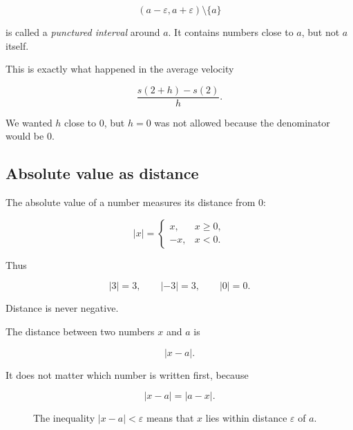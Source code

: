 \[
(a-\varepsilon,a+\varepsilon)\setminus\{a\}
\]

is called a \emph{punctured interval} around \(a\). It contains numbers close to \(a\), but not \(a\) itself.

This is exactly what happened in the average velocity

\[
\frac{s(2+h)-s(2)}{h}.
\]

We wanted \(h\) close to \(0\), but \(h=0\) was not allowed because the denominator would be \(0\).

\subsection{Absolute value as distance}
\label{subsec:absolute-value-distance}

The absolute value of a number measures its distance from \(0\):

\[
|x|=
\begin{cases}
x, & x\ge 0,\\
-x, & x<0.
\end{cases}
\]

Thus

\[
|3|=3,
\qquad
|-3|=3,
\qquad
|0|=0.
\]

Distance is never negative.

The distance between two numbers \(x\) and \(a\) is

\[
|x-a|.
\]

It does not matter which number is written first, because

\[
|x-a|=|a-x|.
\]

\begin{figure}[h]
\centering
{}
\caption{The inequality \(|x-a|<\varepsilon\) means that \(x\) lies within distance \(\varepsilon\) of \(a\).}
\label{fig:absolute-value-neighborhood}
\end{figure}

